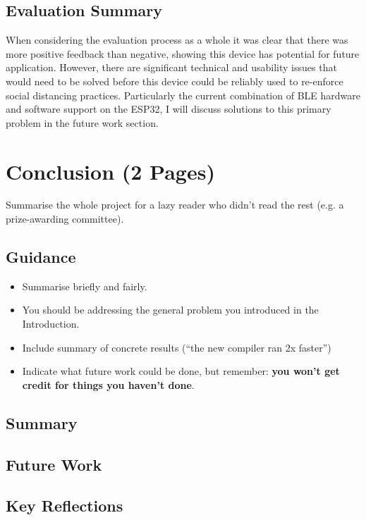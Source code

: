 \documentclass{l4proj}
\begin{document}
\section{Evaluation Summary}

When considering the evaluation process as a whole it was clear that there was more positive feedback than negative, showing this device has potential for future application. However, there are significant technical and usability issues that would need to be solved before this device could be reliably used to re-enforce social distancing practices. Particularly the current combination of BLE hardware and software support on the ESP32, I will discuss solutions to this primary problem in the future work section.

\chapter{Conclusion (2 Pages)}
Summarise the whole project for a lazy reader who didn't read the rest (e.g. a prize-awarding committee).
\section{Guidance}
\begin{itemize}
    \item
          Summarise briefly and fairly.
    \item
          You should be addressing the general problem you introduced in the
          Introduction.
    \item
          Include summary of concrete results (``the new compiler ran 2x
          faster'')
    \item
          Indicate what future work could be done, but remember: \textbf{you
              won't get credit for things you haven't done}.
\end{itemize}

\section{Summary}

\section{Future Work}

\section{Key Reflections}
\end{document}
